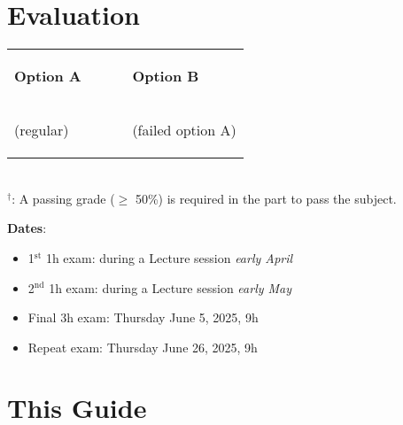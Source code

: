 \section*{Evaluation}

\begin{tabular}{p{0.5\linewidth}p{0.5\linewidth}}
\begin{flushleft}\textbf{Option A}\end{flushleft} & \begin{flushright}\textbf{Option B}\end{flushright}\\[-0.75cm]
\begin{flushleft}(regular)\end{flushleft} & \begin{flushright}(failed option A)\end{flushright}\\[-0.5cm]
\end{tabular}
\begin{center}
\quad
{}
\\
$^{\dagger}$: A passing grade ($\ge$ 50\%) is required in the part to pass the subject.\\[0.1cm]
\end{center}

\noindent
\textbf{Dates}:
\begin{itemize}
\item 1$^\textrm{st}$ 1h exam: during a Lecture session \textit{early April}
\item 2$^\textrm{nd}$ 1h exam: during a Lecture session \textit{early May}
\item Final 3h exam: Thursday June 5, 2025, 9h
\item Repeat exam: Thursday June 26, 2025, 9h
\end{itemize}

\newpage

\section*{This Guide}

